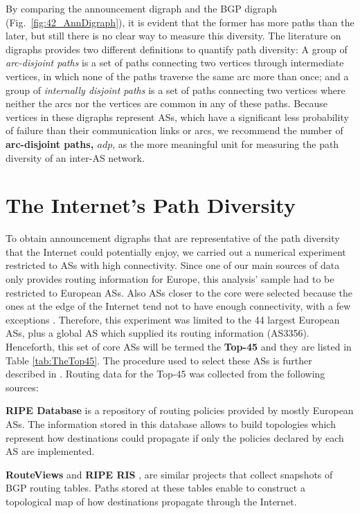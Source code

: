 \documentclass[10pt,final,journal]{IEEEtran}
\begin{document}
By comparing the announcement digraph and the BGP digraph (Fig.~\ref{fig:42_AnnDigraph}), it is evident that the former has more paths than the later, but still there is no clear way to measure this diversity. The literature on digraphs \cite{Bang-Jensen2002} provides two different definitions to quantify path diversity: A group of \emph{arc-disjoint paths} is a set of paths connecting two vertices through intermediate vertices, in which none of the paths traverse the same arc more than once; and a group of \emph{internally disjoint paths} is a set of paths connecting two vertices where neither the arcs nor the vertices are common in any of these paths. Because vertices in these digraphs represent ASs, which have a significant less probability of failure than their communication links or arcs, we recommend the number of \textbf{arc-disjoint paths, $adp$}, as the more meaningful unit for measuring the path diversity of an inter-AS network.



\section{The Internet's Path Diversity}\label{internet_path_div}

To obtain announcement digraphs that are representative of the path diversity that the Internet could potentially enjoy, we carried out a numerical experiment restricted to ASs with high connectivity. Since one of our main sources of data only provides routing information for Europe, this analysis' sample had to be restricted to European ASs. Also ASs closer to the core were selected because the ones at the edge of the Internet tend not to have enough connectivity, with a few exceptions \cite{Oliveira2008}. Therefore, this experiment was limited to the 44 largest European ASs, plus a global AS which supplied its routing information (AS3356). Henceforth, this set of core ASs will be termed the \textbf{Top-45} and they are listed in Table \ref{tab:TheTop45}. The procedure used to select these ASs is further described in \cite{Arjona-Villicana2009}. Routing data for the Top-45 was collected from the following sources:

\textbf{RIPE Database} \cite{RIPEDatabase} is a repository of routing policies provided by mostly European ASs. The information stored in this database allows to build topologies which represent how destinations could propagate if only the policies declared by each AS are implemented.

\textbf{RouteViews} \cite{Routeviews} and \textbf{RIPE RIS} \cite{RIPERIS}, are similar projects that collect snapshots of BGP routing tables. Paths stored at these tables enable to construct a topological map of how destinations propagate through the Internet.
\end{document}
